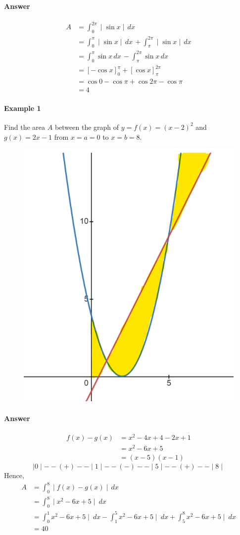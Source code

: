 \documentclass[12pt]{article}
\begin{document}
\paragraph{Answer} 
\begin{align*} 
    A &= \int_0^{2\pi} \mid \sin x \mid\, dx \\
    &= \int_0^{\pi} \mid \sin x \mid\, dx\, + \int_{\pi}^{2\pi} \mid \sin x \mid\, dx \\
    &= \int_0^{\pi} \sin x\, dx\, - \int_{\pi}^{2\pi} \sin x\, dx \\
    &= [- \cos x]^{\pi}_0 + [\cos x]^{2\pi}_{\pi} \\
    &= \cos 0 - \cos  \pi + \cos 2\pi - \cos \pi \\
    &= 4 
\end{align*}

\paragraph{Example 1} Find the area $A$ between the graph of $y = f(x) = (x - 2)^2$ and $g(x) = 2x - 1$ from $x = a = 0$ to $x = b = 8$.
\begin{figure}[H]
     \centering
     \includegraphics[width = 0.4\linewidth]{Images/area example .png}
\end{figure}
\paragraph{Answer} 
\begin{align*} 
    f(x) - g(x) &= x^2 - 4x + 4 - 2x + 1 \\
    &= x^2 - 6x + 5 \\
    &= (x - 5)(x - 1)
\end{align*}
\[
    \mid 0 \mid -- (+) -- \mid 1 \mid -- (-) -- \mid 5 \mid -- (+) -- \mid 8 \mid 
\]
\noindent
Hence,
\begin{align*} 
    A &= \int_0^{8} \mid f(x) - g(x) \mid\, dx \\
    &=  \int_0^{8} \mid x^2 - 6x + 5 \mid\: dx \\
    &= \int_0^{1} x^2 - 6x + 5 \mid\: dx - \int_1^{5} x^2 - 6x + 5 \mid\: dx + \int_5^{8} x^2 - 6x + 5 \mid\: dx \\
    &= 40
\end{align*}
\end{document}
